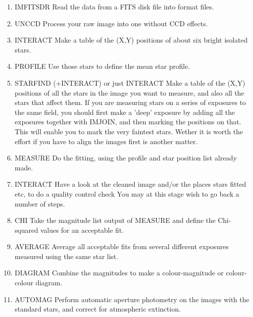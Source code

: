 \begin{enumerate}

 \item IMFITS{\undersc}DR \newline
       Read the data from a FITS disk file into \starman format files.

 \item UNCCD \newline
       Process your raw image into one without CCD effects.

 \item INTERACT \newline    Make a table of the (X,Y) positions of about six bright
                isolated stars.

 \item PROFILE \newline    Use those stars to define the mean star profile.

 \item STARFIND (+INTERACT) or just INTERACT \newline
        Make a table of the (X,Y) positions of all the stars in the image
        you want to measure, and also all the stars that
        affect them. If you are measuring stars on a series
        of exposures to the same field, you should first make a
        'deep' exposure by adding all the exposures together
        with IMJOIN, and then marking the positions on that.
        This will enable you to mark the very faintest stars.
        Wether it is worth the effort if you have to align the
        images first is another matter.

 \item MEASURE   \newline Do the fitting, using the profile and star position
                list already made.

 \item INTERACT    \newline Have a look at the cleaned image and/or the places
          stars fitted etc, to do a quality control check
          You may at this stage wish to go back a number of steps.

 \item  CHI \newline Take the magnitude list output of MEASURE and define
                the Chi-squared values for an acceptable fit.

 \item AVERAGE     \newline Average all acceptable fits from several different
                exposures measured using the same star list.

 \item DIAGRAM  \newline   Combine the magnitudes to make a colour-magnitude
                or colour-colour diagram.

 \item AUTOMAG \newline Perform automatic aperture photometry on the images
               with the standard stars, and correct for atmospheric
               extinction.

\end{enumerate}


